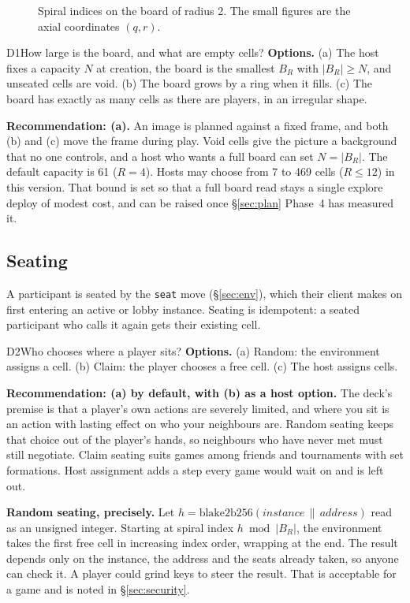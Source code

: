 \documentclass[11pt,a4paper]{article}
\newcommand{\code}[1]{\texttt{#1}}
\begin{document}
\begin{figure}[h]
\centering
\begin{tikzpicture}\end{tikzpicture}
\caption{Spiral indices on the board of radius 2. The small figures are the axial coordinates $(q,r)$.}
\label{fig:spiral}
\end{figure}

\begin{decision}{D1}{How large is the board, and what are empty cells?}
\textbf{Options.} (a) The host fixes a capacity $N$ at creation, the board is the smallest
$B_R$ with $|B_R|\ge N$, and unseated cells are void. (b) The board grows by a ring when it
fills. (c) The board has exactly as many cells as there are players, in an irregular shape.

\textbf{Recommendation: (a).} An image is planned against a fixed frame, and both (b) and (c)
move the frame during play. Void cells give the picture a background that no one controls,
and a host who wants a full board can set $N=|B_R|$. The default capacity is 61 ($R=4$).
Hosts may choose from 7 to 469 cells ($R\le 12$) in this version. That bound is set so that a
full board read stays a single explore deploy of modest cost, and can be raised once
\S\ref{sec:plan} Phase~4 has measured it.
\end{decision}

\subsection{Seating}\label{sec:seating}

A participant is seated by the \code{seat} move (\S\ref{sec:env}), which their client makes on
first entering an active or lobby instance. Seating is idempotent: a seated participant who calls
it again gets their existing cell.

\begin{decision}{D2}{Who chooses where a player sits?}
\textbf{Options.} (a) Random: the environment assigns a cell. (b) Claim: the player chooses a
free cell. (c) The host assigns cells.

\textbf{Recommendation: (a) by default, with (b) as a host option.} The deck's premise is that
a player's own actions are severely limited, and where you sit is an action with lasting
effect on who your neighbours are. Random seating keeps that choice out of the player's hands,
so neighbours who have never met must still negotiate. Claim seating suits games among
friends and tournaments with set formations. Host assignment adds a step every game would wait
on and is left out.

\textbf{Random seating, precisely.} Let $h=\mathrm{blake2b256}(\mathit{instance}\,\|\,\mathit{address})$
read as an unsigned integer. Starting at spiral index $h \bmod |B_R|$, the environment takes
the first free cell in increasing index order, wrapping at the end. The result depends only on
the instance, the address and the seats already taken, so anyone can check it. A player could
grind keys to steer the result. That is acceptable for a game and is noted in
\S\ref{sec:security}.
\end{decision}
\end{document}
